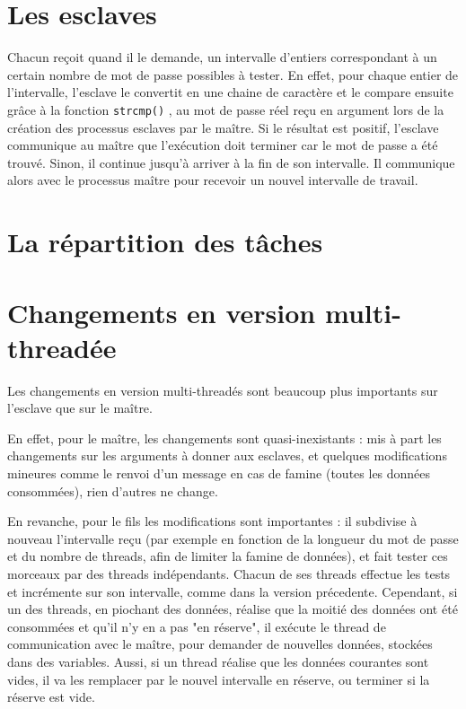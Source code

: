 \documentclass[a4paper,11pt]{article}
\begin{document}
\section{Les esclaves}
Chacun reçoit quand il le demande, un intervalle d'entiers correspondant à un certain nombre de mot de passe possibles à tester.
En effet, pour chaque entier de l'intervalle, l'esclave le convertit en une chaine de caractère et le compare ensuite grâce à la fonction \texttt{strcmp()} , au mot de passe réel reçu en argument lors de la création des processus esclaves par le maître. Si le résultat est positif, l'esclave communique au maître que l'exécution doit terminer car le mot de passe a été trouvé. Sinon, il continue jusqu'à arriver à la fin de son intervalle. Il communique alors avec le processus maître pour recevoir un nouvel intervalle de travail.


\section{La répartition des tâches}


\section{Changements en version multi-threadée}
Les changements en version multi-threadés sont beaucoup plus importants sur l'esclave que sur le maître.

En effet, pour le maître, les changements sont quasi-inexistants : mis à part les changements sur les arguments à donner aux esclaves, et quelques modifications mineures comme le renvoi d'un message en cas de famine (toutes les données consommées), rien d'autres ne change.

En revanche, pour le fils les modifications sont importantes : il subdivise à nouveau l'intervalle reçu (par exemple en fonction de la longueur du mot de passe et du nombre de threads, afin de limiter la famine de données), et fait tester ces morceaux par des threads indépendants.
Chacun de ses threads effectue les tests et incrémente sur son intervalle, comme dans la version précedente. 
Cependant, si un des threads, en piochant des données, réalise que la moitié des données ont été consommées et qu'il n'y en a pas "en réserve", il exécute le thread de communication avec le maître, pour demander de nouvelles données, stockées dans des variables.
Aussi, si un thread réalise que les données courantes sont vides, il va les remplacer par le nouvel intervalle en réserve, ou terminer si la réserve est vide.
\end{document}

